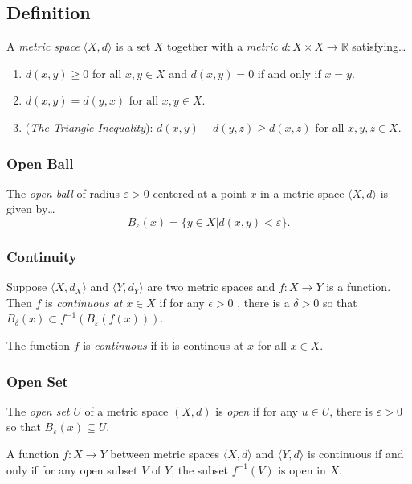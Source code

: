 \subsection{Definition}

A \emph{metric space} $\langle X,d \rangle$ is a set $X$ together with a \emph{metric}\label{metric} $d : X \times X \rightarrow \mathbb{R}$ satisfying\dots
\begin{enumerate}
  \item $d(x,y) \geq 0$ for all $x,y \in X$ and $d(x,y) = 0$ if and only if $x = y$.
  \item $d(x,y) = d(y,x)$ for all $x,y \in X$.
  \item (\emph{The Triangle Inequality}\label{triangleinequality}): $d(x,y) + d(y,z) \geq d(x,z)$ for all $x,y,z \in X.$
\end{enumerate}

\subsubsection{Open Ball}\label{metricopenball}
The \emph{open ball} of radius $\varepsilon > 0$ centered at a point $x$ in a metric space $\langle X,d \rangle$ is given by\dots
$$B_{\varepsilon}(x) = \{ y \in X | d(x,y) < \varepsilon\}.$$

\subsubsection{Continuity}\label{metriccontinuity}
Suppose $\langle X,d_X \rangle$ and $\langle Y,d_Y \rangle$ are two metric spaces and $f: X \rightarrow Y$ is a function. Then $f$ is \emph{continuous at} $x\in X$ if for any $\epsilon > 0$ , there is a $\delta > 0$
so that $B_{\delta}(x) \subset f^{-1}(B_{\varepsilon}(f(x)))$.\newline

\noindent The function $f$ is \emph{continuous} if it is continous at $x$ for all $x \in X$.

\subsubsection{Open Set}\label{metricopenset}
The \emph{open set} $U$ of a metric space $(X,d)$ is \emph{open} if for any $u \in U$, there is $\varepsilon > 0$ so that $B_{\varepsilon}(x) \subseteq U$.

\begin{theorem}
A function $f:X \rightarrow Y$ between metric spaces $\langle X,d \rangle$ and $\langle Y,d \rangle$ is continuous if and only if for any open subset $V$ of $Y$, the subset $f^{-1}(V)$ is open in $X$.
\end{theorem}

